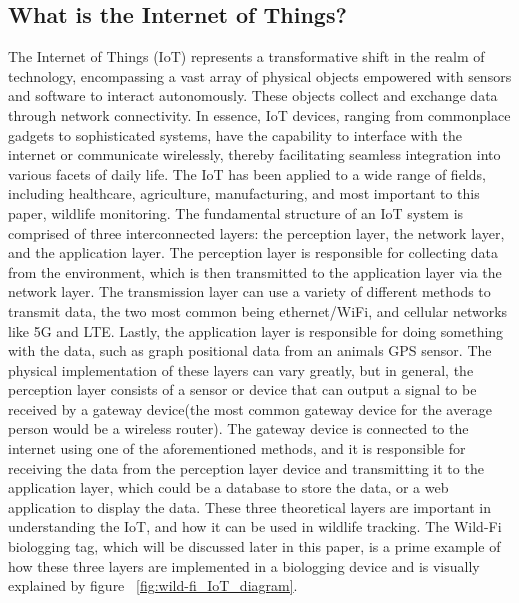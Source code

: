 \documentclass[sigplan,screen,nonacm]{acmart}
\begin{document}
\subsection{What is the Internet of Things?}
\label{subsec:What is the Internet of Things}

The Internet of Things (IoT) represents a transformative shift in the
realm of technology, encompassing a vast array of physical objects empowered
with sensors and software to interact autonomously. These objects collect and
exchange data through network connectivity. In essence, IoT devices, ranging
from commonplace gadgets to sophisticated systems, have the capability to
interface with the internet or communicate wirelessly, thereby facilitating
seamless integration into various facets of daily life. The IoT has been
applied to a wide range of fields, including healthcare, agriculture,
manufacturing, and most important to this paper, wildlife monitoring.
The fundamental structure of an IoT system is comprised of three
interconnected layers: the perception layer, the network layer, and the
application layer\cite{kumar2019internet}. The perception layer is responsible for collecting data
from the environment, which is then transmitted to the application layer via the network layer.
The transmission layer can use a variety of different methods to transmit data, the two most common being
ethernet/WiFi, and cellular networks like 5G and LTE\cite{greengard2021internet}. Lastly, the application
layer is responsible for doing something with the data, such as graph positional data from an
animals GPS sensor. The physical implementation of these layers
can vary greatly, but in general, the perception layer consists of a sensor or device that can
output a signal to be received by a gateway device(the most common gateway device for
the average person would be a wireless router). The gateway device is connected to
the internet using one of the aforementioned methods, and it is responsible for
receiving the data from the perception layer device and transmitting it to the application
layer, which could be a database to store the data, or a web application to display
the data\cite{kumar2019internet}. These three theoretical layers are important in understanding the IoT,
and how it can be used in wildlife tracking. The Wild-Fi biologging tag, which will be
discussed later in this paper, is a prime example of how these three layers are implemented
in a biologging device and is visually explained by figure ~\ref{fig:wild-fi_IoT_diagram}.
\end{document}
